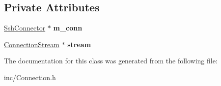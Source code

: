 \subsection*{Private Attributes}
\begin{DoxyCompactItemize}
\item 
\mbox{\label{classConnection_abe9d31246d932dea5624d1d15995f881}} 
\hyperlink{classSshConnector}{Ssh\+Connector} $\ast$ {\bfseries m\+\_\+conn}
\item 
\mbox{\label{classConnection_aa143372c57528fdac5cc4bb251b057ea}} 
\hyperlink{classConnectionStream}{Connection\+Stream} $\ast$ {\bfseries stream}
\end{DoxyCompactItemize}


The documentation for this class was generated from the following file\+:\begin{DoxyCompactItemize}
\item 
inc/Connection.\+h\end{DoxyCompactItemize}

